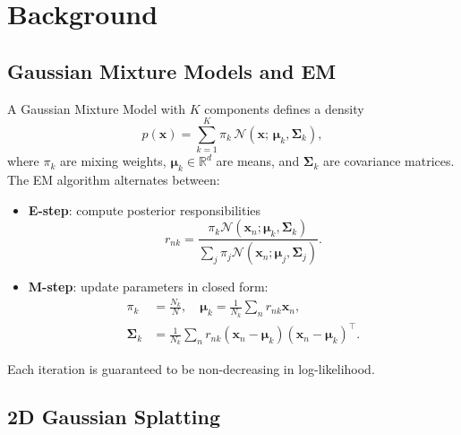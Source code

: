 \documentclass[a4paper,conference]{IEEEtran}
\begin{document}
\section{Background}
\label{sec:background}

\subsection{Gaussian Mixture Models and EM}
\label{subsec:gmm}

A Gaussian Mixture Model with $K$ components defines a density
\begin{equation}
  p(\mathbf{x}) = \sum_{k=1}^{K} \pi_k \, \mathcal{N}(\mathbf{x};\,\boldsymbol{\mu}_k,\boldsymbol{\Sigma}_k),
  \label{eq:gmm}
\end{equation}
where $\pi_k$ are mixing weights, $\boldsymbol{\mu}_k \in \mathbb{R}^d$ are
means, and $\boldsymbol{\Sigma}_k$ are covariance matrices.
The EM algorithm alternates between:
\begin{itemize}
  \item \textbf{E-step}: compute posterior responsibilities
        \begin{equation}
          r_{nk} = \frac{\pi_k \mathcal{N}(\mathbf{x}_n;\boldsymbol{\mu}_k,\boldsymbol{\Sigma}_k)}
                        {\sum_{j}\pi_j \mathcal{N}(\mathbf{x}_n;\boldsymbol{\mu}_j,\boldsymbol{\Sigma}_j)}.
          \label{eq:estep}
        \end{equation}
  \item \textbf{M-step}: update parameters in closed form:
        \begin{align}
          \pi_k &= \tfrac{N_k}{N},\quad
          \boldsymbol{\mu}_k = \tfrac{1}{N_k}\textstyle\sum_n r_{nk}\mathbf{x}_n, \label{eq:mstep}\\
          \boldsymbol{\Sigma}_k &= \tfrac{1}{N_k}\textstyle\sum_n r_{nk}(\mathbf{x}_n \!-\! \boldsymbol{\mu}_k)(\mathbf{x}_n \!-\! \boldsymbol{\mu}_k)^\top. \label{eq:mstep_sigma}
        \end{align}
\end{itemize}
Each iteration is guaranteed to be non-decreasing in log-likelihood.

\subsection{2D Gaussian Splatting}
\label{subsec:gs_background}
\end{document}
